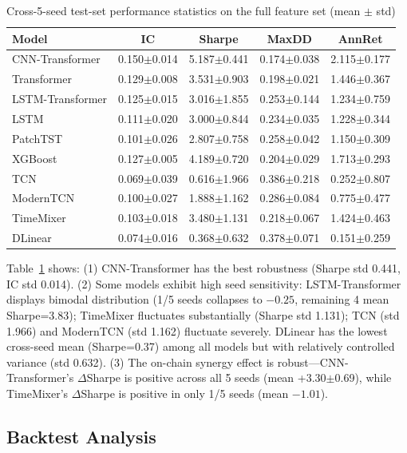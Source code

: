 \documentclass[a4paper]{cas-dc}
\begin{document}
\begin{table}[t]
\centering
\caption{Cross-5-seed test-set performance statistics on the full feature set (mean $\pm$ std)}
\label{tab:multi_seed}
\small
\begin{tabular}{lcccc}
\toprule
Model & IC & Sharpe & MaxDD & AnnRet \\
\midrule
CNN-Transformer & 0.150$\pm$0.014 & 5.187$\pm$0.441 & 0.174$\pm$0.038 & 2.115$\pm$0.177 \\
Transformer & 0.129$\pm$0.008 & 3.531$\pm$0.903 & 0.198$\pm$0.021 & 1.446$\pm$0.367 \\
LSTM-Transformer & 0.125$\pm$0.015 & 3.016$\pm$1.855 & 0.253$\pm$0.144 & 1.234$\pm$0.759 \\
LSTM & 0.111$\pm$0.020 & 3.000$\pm$0.844 & 0.234$\pm$0.035 & 1.228$\pm$0.344 \\
PatchTST & 0.101$\pm$0.026 & 2.807$\pm$0.758 & 0.258$\pm$0.042 & 1.150$\pm$0.309 \\
XGBoost & 0.127$\pm$0.005 & 4.189$\pm$0.720 & 0.204$\pm$0.029 & 1.713$\pm$0.293 \\
TCN & 0.069$\pm$0.039 & 0.616$\pm$1.966 & 0.386$\pm$0.218 & 0.252$\pm$0.807 \\
ModernTCN & 0.100$\pm$0.027 & 1.888$\pm$1.162 & 0.286$\pm$0.084 & 0.775$\pm$0.477 \\
TimeMixer & 0.103$\pm$0.018 & 3.480$\pm$1.131 & 0.218$\pm$0.067 & 1.424$\pm$0.463 \\
DLinear & 0.074$\pm$0.016 & 0.368$\pm$0.632 & 0.378$\pm$0.071 & 0.151$\pm$0.259 \\
\bottomrule
\end{tabular}
\end{table}

Table~\ref{tab:multi_seed} shows: (1) CNN-Transformer has the best robustness (Sharpe std 0.441, IC std 0.014). (2) Some models exhibit high seed sensitivity: LSTM-Transformer displays bimodal distribution (1/5 seeds collapses to $-0.25$, remaining 4 mean Sharpe=3.83); TimeMixer fluctuates substantially (Sharpe std 1.131); TCN (std 1.966) and ModernTCN (std 1.162) fluctuate severely. DLinear has the lowest cross-seed mean (Sharpe=0.37) among all models but with relatively controlled variance (std 0.632). (3) The on-chain synergy effect is robust---CNN-Transformer's $\Delta$Sharpe is positive across all 5 seeds (mean +3.30$\pm$0.69), while TimeMixer's $\Delta$Sharpe is positive in only 1/5 seeds (mean $-1.01$).

\subsection{Backtest Analysis}
\end{document}
